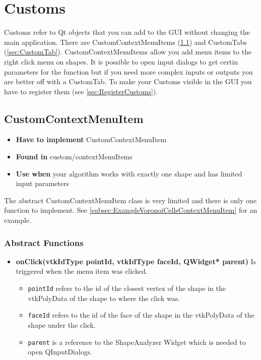 
\chapter{Customs}

Customs refer to Qt objects that you can add to the GUI without changing the main application. There are CustomContextMenuItems (\ref{sec:CustomContextMenuItem}) and CustomTabs (\ref{sec:CustomTab}). CustomContextMenuItems allow you add menu items to the right click menu on shapes. It is possible to open input dialogs to get certin parameters for the function but if you need more complex inputs or outputs you are better off with a CustomTab. To make your Customs visible in the GUI you have to register them (see \ref{sec:RegisterCustoms}).

\section{CustomContextMenuItem}
\label{sec:CustomContextMenuItem}

\begin{itemize}
	\item \textbf{Have to implement} CustomContextMenuItem
	\item \textbf{Found in} custom/contextMenuItems
	\item \textbf{Use when} your algorithm works with exactly one shape and has limited input parameters
\end{itemize}

The abstract CustomContextMenuItem class is very limited and there is only one function to implement. See \ref{subsec:ExampleVoronoiCellsContextMenuItem} for an example. 

\subsection{Abstract Functions}

\begin{itemize}
	\item \textbf{onClick(vtkIdType pointId, vtkIdType faceId, QWidget* parent)} Is triggered when the menu item was clicked. 
	\begin{itemize}
		\item \texttt{pointId} refers to the id of the closest vertex of the shape in the vtkPolyData of the shape to where the click was. 
		\item \texttt{faceId} refers to the id of the face of the shape in the vtkPolyData of the shape under the click. 
		\item \texttt{parent} is a reference to the ShapeAnalyzer Widget which is needed to open QInputDialogs.
	\end{itemize}
\end{itemize}

